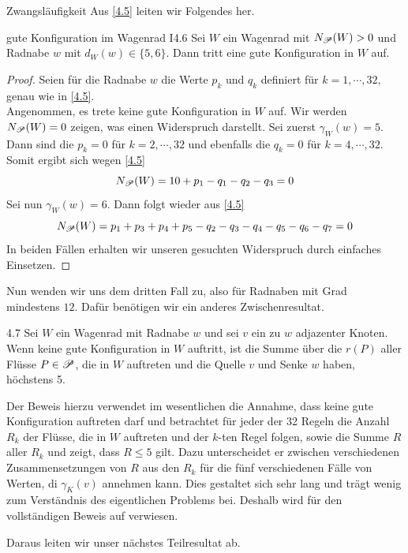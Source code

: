 \begin{section}{Zwangsläufigkeit}
  Aus \ref{4.5} leiten wir Folgendes her.

 \begin{satzl}{gute Konfiguration im Wagenrad I}{4.6}
  Sei $W$ ein Wagenrad mit $N_{\mathscr{P}}(W) > 0$ und Radnabe $w$ mit $d_W(w) \in \{5,6\}$. Dann tritt eine gute Konfiguration in $W$ auf.
 \end{satzl}
 
 \begin{proof}
  Seien für die Radnabe $w$ die Werte $p_k$ und $q_k$ definiert für $k = 1,\cdots,32$, genau wie in \ref{4.5}.\\
  Angenommen, es trete keine gute Konfiguration in $W$ auf. Wir werden $N_{\mathscr{P}}(W) = 0$ zeigen, was einen Widerspruch darstellt. Sei zuerst $\gamma_W(w) = 5$. Dann sind die $p_k = 0$ für $k = 2,\cdots,32$ und ebenfalls die $q_k = 0$ für $k = 4,\cdots,32$. Somit ergibt sich wegen \ref{4.5}
  \[ N_{\mathscr{P}}(W) = 10 + p_1 - q_1 - q_2 - q_3 = 0 \]
  Sei nun $\gamma_W(w) = 6$. Dann folgt wieder aus \ref{4.5}
  \[ N_{\mathscr{P}}(W) = p_1 + p_3 + p_4 + p_5 - q_2 - q_3 - q_4 - q_5 - q_6 - q_7 = 0\]
  In beiden Fällen erhalten wir unseren gesuchten Widerspruch durch einfaches Einsetzen.
 \end{proof}
 
 Nun wenden wir uns dem dritten Fall zu, also für Radnaben  mit Grad mindestens $12$. Dafür benötigen wir ein anderes Zwischenresultat.
 
 \begin{lemmal}{}{4.7}
  Sei $W$ ein Wagenrad mit Radnabe $w$ und sei $v$ ein zu $w$ adjazenter Knoten. Wenn keine gute Konfiguration in $W$ auftritt, ist die Summe über die $r(P)$ aller Flüsse $P \in \mathscr{P}$, die in $W$ auftreten und die Quelle $v$ und Senke $w$ haben, höchstens 5.
 \end{lemmal}

 Der Beweis hierzu verwendet im wesentlichen die Annahme, dass keine gute Konfiguration auftreten darf und betrachtet für jeder der 32 Regeln die Anzahl $R_k$ der Flüsse, die in $W$ auftreten und der $k$-ten Regel folgen, sowie die Summe $R$ aller $R_k$ und zeigt, dass $R \leq 5$ gilt. Dazu unterscheidet er zwischen verschiedenen Zusammensetzungen von $R$ aus den $R_k$ für die fünf verschiedenen Fälle von Werten, di $\gamma_K(v)$ annehmen kann. Dies gestaltet sich sehr lang und trägt wenig zum Verständnis des eigentlichen Problems bei. Deshalb wird für den vollständigen Beweis auf \cite[Seite 21, Lemma 4.7]{FourRSST} verwiesen.
 
 Daraus leiten wir unser nächstes Teilresultat ab.
 

\end{section}
